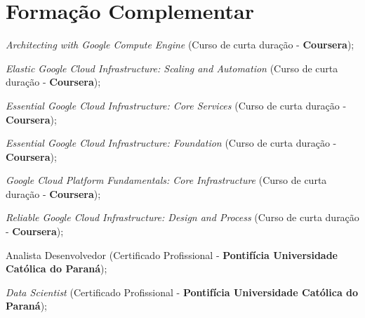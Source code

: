 \documentclass[letterpaper,11pt]{article}
\newcommand{\resumeSubHeadingListStart}{\begin{itemize}[leftmargin=*]}
\newcommand{\resumeSubHeadingListEnd}{\end{itemize}}
\begin{document}
 \section{Formação Complementar}
 \resumeSubHeadingListStart
    \color{gray}
    \small{
        \item {\textit{Architecting with Google Compute Engine} (Curso de curta duração - \textbf{Coursera});}
        \item {\textit{Elastic Google Cloud Infrastructure: Scaling and Automation} (Curso de curta duração - \textbf{Coursera});}
        \item {\textit{Essential Google Cloud Infrastructure: Core Services} (Curso de curta duração - \textbf{Coursera});}
        \item {\textit{Essential Google Cloud Infrastructure: Foundation} (Curso de curta duração - \textbf{Coursera});}
        \item {\textit{Google Cloud Platform Fundamentals: Core Infrastructure} (Curso de curta duração - \textbf{Coursera});}
        \item {\textit{Reliable Google Cloud Infrastructure: Design and Process} (Curso de curta duração - \textbf{Coursera});}
        \item {Analista Desenvolvedor (Certificado Profissional - \textbf{Pontifícia Universidade Católica do Paraná});}
        \item {\textit{Data Scientist} (Certificado Profissional - \textbf{Pontifícia Universidade Católica do Paraná});}
    }
 \resumeSubHeadingListEnd
\end{document}
